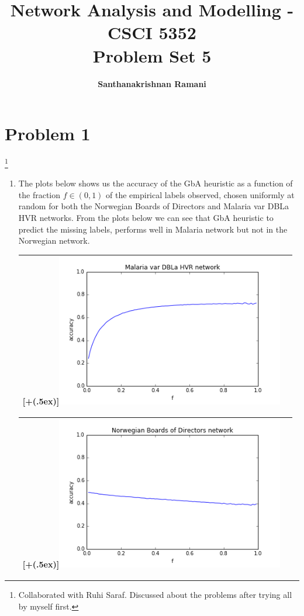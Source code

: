 \documentclass{article}
\date{\displaydate{date}}
\title{\textbf{Network Analysis and Modelling - CSCI 5352} \\
Problem Set 5}
\author{\textbf{Santhanakrishnan Ramani}}
\newcommand\blfootnote[1]{%
  \begingroup
  \renewcommand\thefootnote{}\footnote{#1}%
  \addtocounter{footnote}{-1}%
  \endgroup
}
\newcommand*{\addheight}[2][.5ex]{%
  \raisebox{0pt}[\dimexpr\height+(#1)\relax]{#2}%
}
\begin{document}
\maketitle

\section*{Problem 1}
\blfootnote{Collaborated with Ruhi Saraf. Discussed about the problems after trying all by myself first.}
\begin{enumerate}[label=(\alph*)]
\item
The plots below shows us the accuracy of the GbA heuristic as a function of the fraction $f \in (0,1)$ of the empirical labels observed, chosen uniformly at random for both the Norwegian Boards of Directors and Malaria var DBLa HVR networks. From the plots below we can see that GbA heuristic to predict the missing labels, performs well in Malaria network but not in the Norwegian network.

\begin{table}[H]
\centering
\begin{tabular}{|c|c|}
	\hline
	\addheight{\includegraphics[width=100mm]{images/1a_HVR.png}} \\
	\hline
\end{tabular}
\end{table}
\begin{table}[H]
\centering
\begin{tabular}{|c|c|}
	\hline
	\addheight{\includegraphics[width=100mm]{images/1a_net1m.png}} \\
	\hline
\end{tabular}
\end{table}


\end{enumerate}
\end{document}
